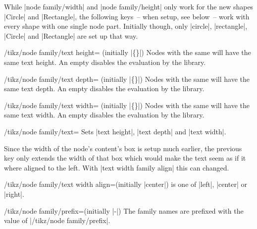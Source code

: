 While |node family/width| and |node family/height| only work for the new shapes |Circle| and |Rectangle|,
the following keys~-- when setup, see below~-- work with every shape with one single node part.
Initially though, only |circle|, |rectangle|, |Circle| and |Rectangle| are set up that way.
\begin{key}{/tikz/node family/text height= (initially |\{\}|)}
Nodes with the same  will have the same text height.
An empty  disables the evaluation by the library.
\end{key}

\begin{key}{/tikz/node family/text depth= (initially |\{\}|)}
Nodes with the same   will have the same text depth.
An empty  disables the evaluation by the library.
\end{key}

\begin{key}{/tikz/node family/text width= (initially |\{\}|)}
Nodes with the same  will have the same text width.
An empty  disables the evaluation by the library.
\end{key}

\begin{key}{/tikz/node family/text=}
Sets |text height|, |text depth| and |text width|.
\end{key}

Since the width of the node's content's box is setup much earlier,
the previous key only extends the width of that box which would make the text
seem as if it where aligned to the left.
With |text width family align| this can changed.
\begin{key}{/tikz/node family/text width align=(initially |center|)}
 is one of |left|, |center| or |right|.

\begin{codeexample}[preamble=\usetikzlibrary{positioning,ext.node-families},/tikz/node distance=.5cm]
\tikzexternaldisable %
\end{codeexample}
\end{key}

\begin{key}{/tikz/node family/prefix=(initially \expandafter|\string\pgfpictureid-|)}
The family names are prefixed with the value of |/tikz/node family/prefix|.
\end{key}

